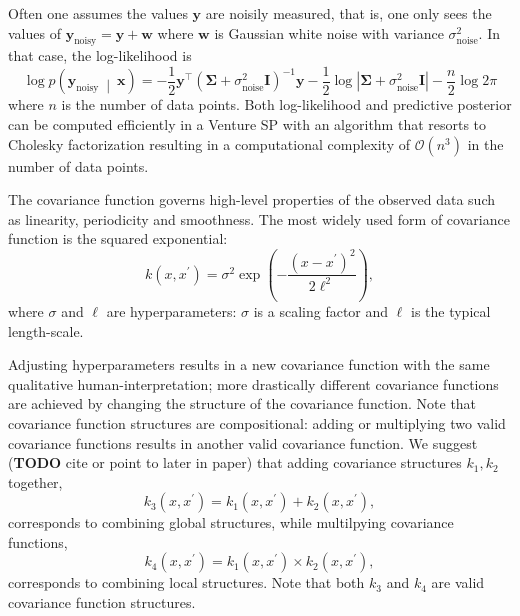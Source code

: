 \documentclass{article} %
\newcommand{\noisy}{{\textrm{noisy}}}
\newcommand{\noise}{{\textrm{noise}}}
\newcommand{\wbf}{\mathbf{w}}
\newcommand{\xbf}{\mathbf{x}}
\newcommand{\ybf}{\mathbf{y}}
\newcommand{\Ibf}{\mathbf{I}}
\newcommand{\pn}[1]{\left( #1 \right)}
\newcommand{\abs}[1]{\left\lvert #1 \right\rvert}
\newcommand{\mvert}{\ \middle\vert\ }
\begin{document}
Often one assumes the values $\ybf$ are noisily measured, that is, one only sees the values of $\ybf_\noisy = \ybf + \wbf$ where $\wbf$ is Gaussian white noise with variance $\sigma_\noise^2$.
In that case, the log-likelihood is
\begin{equation}
\log p\pn{\ybf_\noisy \mvert \xbf} =
-\frac12 \ybf^\top (\bm{\Sigma}
+ \sigma_\noise^2 \Ibf)^{-1} \ybf
- \frac12\log \abs{\bm{\Sigma} + \sigma_\noise^2 \Ibf}
- \frac{n}{2}\log 2\pi
\end{equation}
where $n$ is the number of data points.
Both log-likelihood and predictive posterior can be computed efficiently in a Venture SP with an algorithm that resorts to Cholesky factorization\citep[chap. 2]{rasmussen2006gaussian} resulting in a computational complexity of $\mathcal{O}(n^3)$ in the number of data points.



The covariance function governs high-level properties of the observed data such as linearity, periodicity and smoothness.
The most widely used form of covariance function is the squared exponential:
\begin{equation}
  k(x,x^\prime) = \sigma^2 \exp\pn{-\frac{(x-x^\prime)^2}{2\ell^2}},
\end{equation}
where $\sigma$ and $\ell$ are hyperparameters: $\sigma$ is a scaling factor and $\ell$ is the typical length-scale.

Adjusting hyperparameters results in a new covariance function with the same qualitative human-interpretation; more drastically different covariance functions are achieved by changing the structure of the covariance function.
Note that covariance function structures are compositional: adding or multiplying two valid covariance functions results in another valid covariance function.
We suggest ({\bf TODO} cite or point to later in paper) that adding covariance structures $k_1,k_2$ together,
\begin{equation}
k_3(x,x^\prime) = k_1(x,x^\prime) + k_2(x,x^\prime),
\end{equation}
corresponds to combining global structures, while multilpying covariance functions,
\begin{equation}
k_4(x,x^\prime) = k_1(x,x^\prime) \times k_2(x,x^\prime),
\end{equation}
corresponds to combining local structures.
Note that both $k_3$ and $k_4$ are valid covariance function structures.
\end{document}
